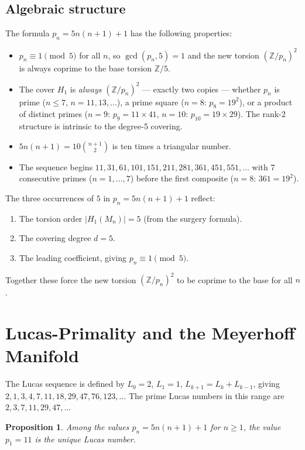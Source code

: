 \documentclass[11pt,a4paper]{article}
\newtheorem{proposition}[theorem]{Proposition}
\theoremstyle{definition}
\newcommand{\ZZ}{\mathbb{Z}}
\newcommand{\Zfive}{\ZZ/5}
\newcommand{\Mn}{M_n}
\begin{document}
\subsection{Algebraic structure}

The formula $p_n = 5n(n+1)+1$ has the following properties:
\begin{itemize}
\item $p_n \equiv 1 \pmod{5}$ for all $n$,
  so $\gcd(p_n,5)=1$ and the new torsion $(\ZZ/p_n)^2$
  is always coprime to the base torsion $\Zfive$.
\item The cover $H_1$ is \emph{always} $(\ZZ/p_n)^2$ --- exactly
  two copies --- whether $p_n$ is prime ($n \leq 7$, $n=11,13,\ldots$),
  a prime square ($n=8$: $p_8=19^2$),
  or a product of distinct primes ($n=9$: $p_9=11\times41$,
  $n=10$: $p_{10}=19\times29$).
  The rank-2 structure is intrinsic to the degree-5 covering.
\item $5n(n+1) = 10\binom{n+1}{2}$ is ten times a triangular number.
\item The sequence begins $11, 31, 61, 101, 151, 211, 281,
  361, 451, 551, \ldots$
  with 7 consecutive primes ($n=1,\ldots,7$) before the first
  composite ($n=8$: $361=19^2$).
\end{itemize}

The three occurrences of $5$ in $p_n = 5n(n+1)+1$ reflect:
\begin{enumerate}
\item The torsion order $|H_1(\Mn)| = 5$ (from the surgery formula).
\item The covering degree $d=5$.
\item The leading coefficient, giving $p_n \equiv 1 \pmod 5$.
\end{enumerate}
Together these force the new torsion $(\ZZ/p_n)^2$ to be coprime
to the base for all $n$.

\section{Lucas-Primality and the Meyerhoff Manifold}
\label{sec:lucas}

The Lucas sequence is defined by $L_0=2$, $L_1=1$,
$L_{k+1}=L_k+L_{k-1}$, giving
$2,1,3,4,7,11,18,29,47,76,123,\ldots$
The prime Lucas numbers in this range are $2,3,7,11,29,47,\ldots$

\begin{proposition}
Among the values $p_n = 5n(n+1)+1$ for $n \geq 1$,
the value $p_1 = 11$ is the unique Lucas number.
\end{proposition}
\end{document}
